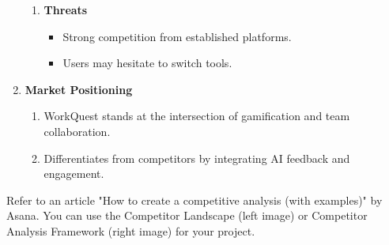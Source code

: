 \begin{enumerate}
\begin{enumerate}
        \item \textbf{Threats}
        \begin{itemize}
            \item Strong competition from established platforms.
            \item Users may hesitate to switch tools.
        \end{itemize}
    \end{enumerate}

    \item \textbf{Market Positioning}
    \begin{enumerate}
        \item WorkQuest stands at the intersection of gamification and team collaboration.
        \item Differentiates from competitors by integrating AI feedback and engagement.
    \end{enumerate}

\end{enumerate}


Refer to an article "How to create a competitive analysis (with
examples)" by Asana. You can use the Competitor Landscape (left image) or
Competitor Analysis Framework (right image) for your project.

